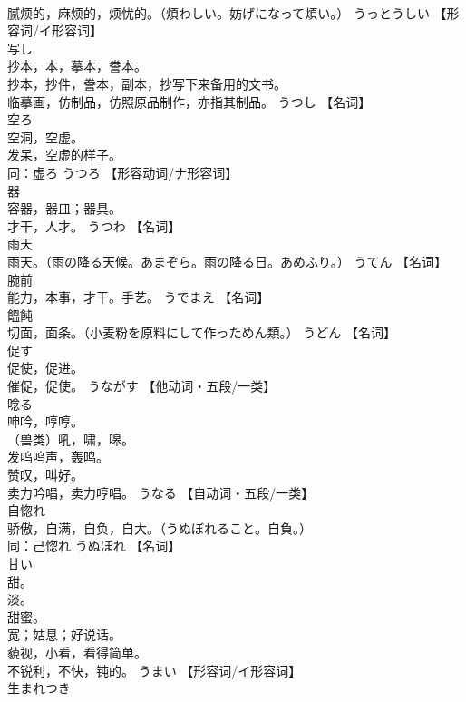 \documentclass[8pt]{extreport}
\begin{document}
\begin{CJK}{UTF8}{min}
\\	腻烦的，麻烦的，烦忧的。（煩わしい。妨げになって煩い。）	うっとうしい		【形容词/イ形容词】
\\	写し	
\\	抄本，本，摹本，誊本。 
\\	抄本，抄件，誊本，副本，抄写下来备用的文书。 
\\	临摹画，仿制品，仿照原品制作，亦指其制品。	うつし		【名词】
\\	空ろ	
\\	空洞，空虚。 
\\	发呆，空虚的样子。 
\\	同：虚ろ	うつろ		【形容动词/ナ形容词】
\\	器	
\\	容器，器皿；器具。 
\\	才干，人才。	うつわ		【名词】
\\	雨天	
\\	雨天。（雨の降る天候。あまぞら。雨の降る日。あめふり。）	うてん		【名词】
\\	腕前	
\\	能力，本事，才干。手艺。	うでまえ		【名词】
\\	饂飩	
\\	切面，面条。（小麦粉を原料にして作っためん類。）	うどん		【名词】
\\	促す	
\\	促使，促进。 
\\	催促，促使。	うながす		【他动词・五段/一类】
\\	唸る	
\\	呻吟，哼哼。 
\\	（兽类）吼，啸，嗥。 
\\	发呜呜声，轰鸣。 
\\	赞叹，叫好。 
\\	卖力吟唱，卖力哼唱。	うなる		【自动词・五段/一类】
\\	自惚れ	
\\	骄傲，自满，自负，自大。（うぬぼれること。自負。） 
\\	同：己惚れ	うぬぼれ		【名词】
\\	甘い	
\\	甜。 
\\	淡。 
\\	甜蜜。 
\\	宽；姑息；好说话。 
\\	藐视，小看，看得简单。 
\\	不锐利，不快，钝的。	うまい		【形容词/イ形容词】
\\	生まれつき	

\end{CJK}
\end{document}
